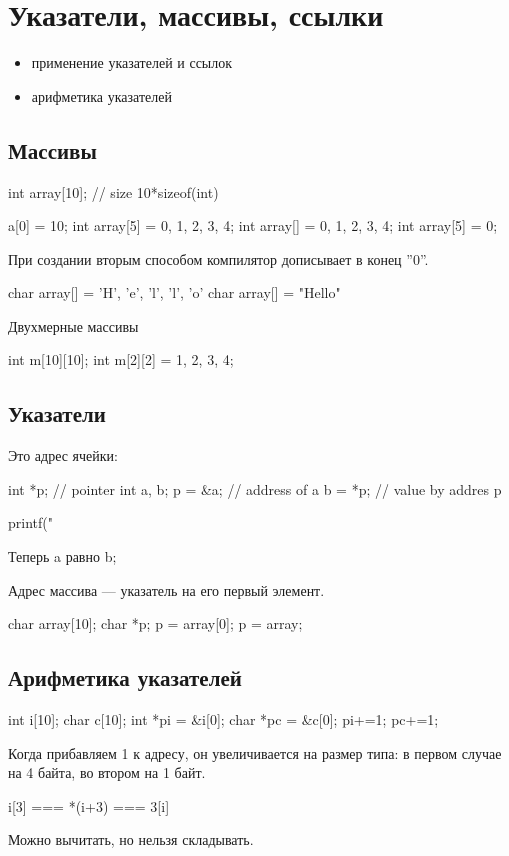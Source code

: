 % 
% 
\section{Указатели, массивы, ссылки}
\begin{itemize}[noitemsep]
    \item применение указателей и ссылок
    \item арифметика указателей
\end{itemize}
\subsection{Массивы}
\begin{ccode}
int array[10]; // size 10*sizeof(int)

a[0] = 10;
int array[5] = {0, 1, 2, 3, 4};
int array[] = {0, 1, 2, 3, 4};
int array[5] = {0};
\end{ccode}
При создании вторым способом компилятор дописывает в конец ''0''.
\begin{ccode}
char array[] = {'H', 'e', 'l', 'l', 'o'}
char array[] = "Hello"
\end{ccode}
Двухмерные массивы
\begin{ccode}
int m[10][10];
int m[2][2] = { {1, 2}, {3, 4}};
\end{ccode}
\subsection{Указатели}
Это адрес ячейки:
\begin{ccode}
int *p; // pointer
int a, b;
p = &a; // address of a
b = *p; // value by addres p

printf("%
\end{ccode}
Теперь a равно b;

Адрес массива --- указатель на его первый элемент.
\begin{ccode}
char array[10];
char *p;
p = array[0];
p = array;
\end{ccode}
\subsection{Арифметика указателей}
\begin{ccode}
int i[10];
char c[10];
int *pi = &i[0];
char *pc = &c[0];
pi+=1;
pc+=1;
\end{ccode}
Когда прибавляем 1 к адресу, он увеличивается на размер типа: в первом случае на 4 байта, во втором на 1 байт.
\begin{ccode}
i[3] === *(i+3) === 3[i]
\end{ccode}
Можно вычитать, но нельзя складывать.
